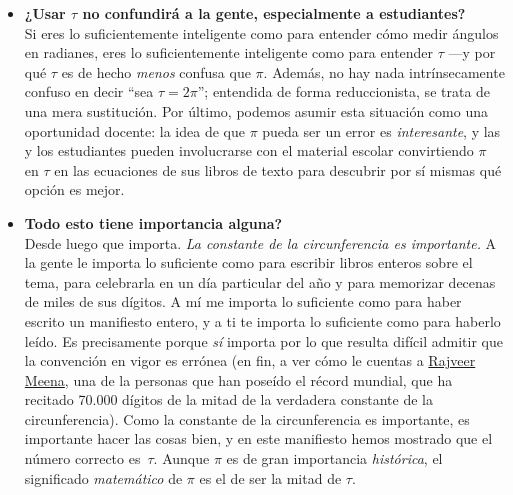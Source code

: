 \begin{itemize}
  \item \textbf{¿Usar $\tau$ no confundirá a la gente, especialmente a estudiantes?} \\  Si eres lo suficientemente inteligente como para entender cómo medir ángulos en radianes, eres lo suficientemente inteligente como para entender $\tau$ ---y por qué $\tau$ es de hecho \emph{menos} confusa que $\pi$. Además, no hay nada intrínsecamente confuso en decir ``sea $\tau = 2\pi$''; entendida de forma reduccionista, se trata de una mera sustitución. Por último, podemos asumir esta situación como una oportunidad docente: la idea de que $\pi$ pueda ser un error es \emph{interesante}, y las y los estudiantes pueden involucrarse con el material escolar convirtiendo $\pi$ en $\tau$ en las ecuaciones de sus libros de texto para descubrir por sí mismas qué opción es mejor.

  \item \textbf{Todo esto tiene importancia alguna?} \\ Desde luego que importa. \emph{La constante de la circunferencia es importante.} A la gente le importa lo suficiente como para escribir libros enteros sobre el tema, para celebrarla en un día particular del año y para memorizar decenas de miles de sus dígitos. A mí me importa lo suficiente como para haber escrito un manifiesto entero, y a ti te importa lo suficiente como para haberlo leído. Es precisamente porque \emph{sí} importa por lo que resulta difícil admitir que la convención en vigor es errónea (en fin, a ver cómo le cuentas a \href{https://www.guinnessworldrecords.com/world-records/most-pi-places-memorised}{Rajveer Meena}, una de la personas que han poseído el récord mundial, que ha recitado 70.000 dígitos de la mitad de la verdadera constante de la circunferencia). Como la constante de la circunferencia es importante, es importante hacer las cosas bien, y en este manifiesto hemos mostrado que el número correcto es~$\tau$. Aunque $\pi$ es de gran importancia \emph{histórica}, el significado \emph{matemático} de $\pi$ es el de ser la mitad de $\tau$.


\end{itemize}
